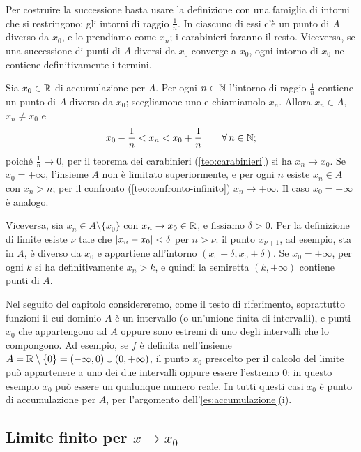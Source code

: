 \begin{strategia}
Per costruire la successione basta usare la definizione con una famiglia di intorni che
si restringono: gli intorni di raggio $\frac1n$. In ciascuno di essi c'è un punto di $A$
diverso da $x_{0}$, e lo prendiamo come $x_{n}$; i carabinieri faranno il resto.
Viceversa, se una successione di punti di $A$ diversi da $x_{0}$ converge a $x_{0}$,
ogni intorno di $x_{0}$ ne contiene definitivamente i termini.
\end{strategia}

\begin{dimostrazione}
Sia $x_{0}\in\mathbb{R}$ di accumulazione per $A$. Per ogni $n\in\mathbb{N}$ l'intorno di raggio
$\frac1n$ contiene un punto di $A$ diverso da $x_{0}$; scegliamone uno e chiamiamolo
$x_{n}$. Allora $x_{n}\in A$, $x_{n}\neq x_{0}$ e
\[
  x_{0}-\frac1n<x_{n}<x_{0}+\frac1n \qquad\forall\, n\in\mathbb{N} ;
\]
poiché $\frac1n\to0$, per il teorema dei carabinieri (\cref{teo:carabinieri}) si ha
$x_{n}\to x_{0}$. Se $x_{0}=+\infty$, l'insieme $A$ non è limitato superiormente, e per
ogni $n$ esiste $x_{n}\in A$ con $x_{n}>n$; per il confronto (\cref{teo:confronto-infinito})
$x_{n}\to+\infty$. Il caso $x_{0}=-\infty$ è analogo.

Viceversa, sia $x_{n}\in A\setminus\{x_{0}\}$ con $x_{n}\to x_{0}\in\mathbb{R}$, e fissiamo
$\delta>0$. Per la definizione di limite esiste $\nu$ tale che $\lvert x_{n}-x_{0}\rvert<\delta$
per $n>\nu$: il punto $x_{\nu+1}$, ad esempio, sta in $A$, è diverso da $x_{0}$ e
appartiene all'intorno $(x_{0}-\delta,x_{0}+\delta)$. Se $x_{0}=+\infty$, per ogni $k$ si
ha definitivamente $x_{n}>k$, e quindi la semiretta $(k,+\infty)$ contiene punti di $A$.
\end{dimostrazione}

Nel seguito del capitolo considereremo, come il testo di riferimento, soprattutto
funzioni il cui dominio $A$ è un intervallo (o un'unione finita di intervalli), e punti
$x_{0}$ che appartengono ad $A$ oppure sono estremi di uno degli intervalli che lo
compongono. Ad esempio, se $f$ è definita nell'insieme $A=\mathbb{R}\setminus\{0\}=(-\infty,0)\cup
(0,+\infty)$, il punto $x_{0}$ prescelto per il calcolo del limite può appartenere a uno
dei due intervalli oppure essere l'estremo $0$: in questo esempio $x_{0}$ può essere un
qualunque numero reale. In tutti questi casi $x_{0}$ è punto di accumulazione per $A$,
per l'argomento dell'\cref{es:accumulazione}(i).

\subsection{Limite finito per \texorpdfstring{$x\to x_{0}$}{x che tende a x0}}

